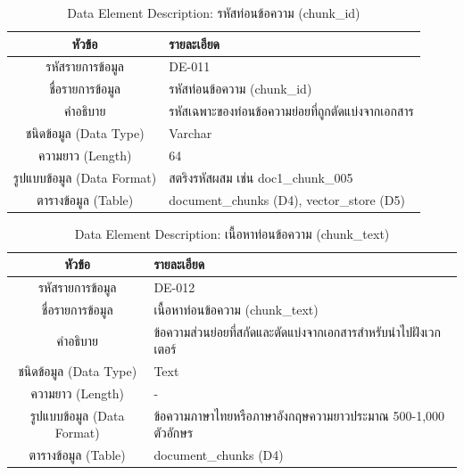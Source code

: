 \begin{table}[htbp]
\centering
\caption{Data Element Description: รหัสท่อนข้อความ (chunk\_id)}
\label{tab3:de_chunk_id}
\begin{tabularx}{\textwidth}{| c | L |}
\hline
\textbf{หัวข้อ} & \textbf{รายละเอียด} \\ \hline
รหัสรายการข้อมูล & DE-011 \\ \hline
ชื่อรายการข้อมูล & รหัสท่อนข้อความ (chunk\_id) \\ \hline
คำอธิบาย & รหัสเฉพาะของท่อนข้อความย่อยที่ถูกตัดแบ่งจากเอกสาร \\ \hline
ชนิดข้อมูล (Data Type) & Varchar \\ \hline
ความยาว (Length) & 64 \\ \hline
รูปแบบข้อมูล (Data Format) & สตริงรหัสผสม เช่น doc1\_chunk\_005 \\ \hline
ตารางข้อมูล (Table) & document\_chunks (D4), vector\_store (D5) \\ \hline
\end{tabularx}
\end{table}

\begin{table}[htbp]
\centering
\caption{Data Element Description: เนื้อหาท่อนข้อความ (chunk\_text)}
\label{tab3:de_chunk_text}
\begin{tabularx}{\textwidth}{| c | L |}
\hline
\textbf{หัวข้อ} & \textbf{รายละเอียด} \\ \hline
รหัสรายการข้อมูล & DE-012 \\ \hline
ชื่อรายการข้อมูล & เนื้อหาท่อนข้อความ (chunk\_text) \\ \hline
คำอธิบาย & ข้อความส่วนย่อยที่สกัดและตัดแบ่งจากเอกสารสำหรับนำไปฝังเวกเตอร์ \\ \hline
ชนิดข้อมูล (Data Type) & Text \\ \hline
ความยาว (Length) & - \\ \hline
รูปแบบข้อมูล (Data Format) & ข้อความภาษาไทยหรือภาษาอังกฤษความยาวประมาณ 500-1,000 ตัวอักษร \\ \hline
ตารางข้อมูล (Table) & document\_chunks (D4) \\ \hline
\end{tabularx}
\end{table}


